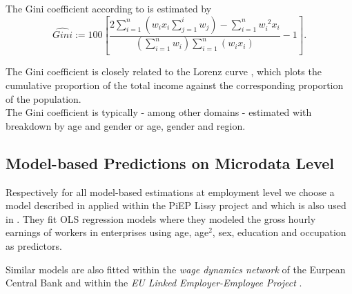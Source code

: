 \documentclass[12pt]{article}
\begin{document}
The Gini coefficient according to \citet{EU-SILC04, EU-SILC09} is estimated by
\begin{equation} \label{Equ:gini}
\widehat{Gini} :=  100 \left[ \frac{2 \sum_{i=1}^{n} \left( w_{i} x_{i} 
\sum_{j=1}^{i} w_{j} \right) - \sum_{i=1}^{n} w_{i}^{\phantom{i}2} 
x_{i}}{\left( \sum_{i=1}^{n} w_{i} \right) \sum_{i=1}^{n} \left(w_{i} x_{i} 
\right)} - 1 \right].
\end{equation}

The Gini coefficient is closely related to the Lorenz curve \citep{lorenz05},
which plots the cumulative proportion of the total income against the
corresponding proportion of the population. \\

%
%
The Gini coefficient is typically - among other domains - estimated
with breakdown by age and gender or age, gender and region.



\subsection{Model-based Predictions on Microdata Level} \label{appendix:mod}

Respectively for all model-based estimations at employment level we choose
a model described in \cite{marsden99} applied within the PiEP Lissy project and
which is also used in \cite{dybczak10}. They fit OLS regression models where
they modeled the gross hourly earnings of workers in enterprises using 
age, age$^2$, sex, education and occupation as predictors. 

Similar models are also fitted within the
\textit{wage dynamics network} of the Eurpean Central Bank
\citep{caju11,pointner10} and within the \textit{EU Linked Employer-Employee Project} 
\citep[see, e.g.,][]{simon10}.
\end{document}
